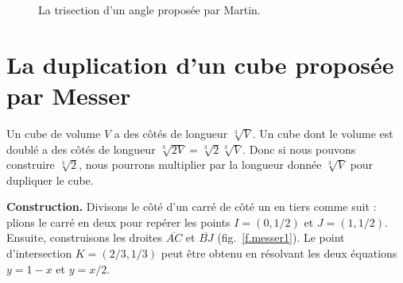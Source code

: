 \begin{figure}[htbp]

\caption{La trisection d'un angle proposée par Martin.}\label{f.martin}
\end{figure}



\section{La duplication d'un cube proposée par Messer}\label{s.messer}

Un cube de volume $V$ a des côtés de longueur $\sqrt[3]{V}$. Un cube dont le volume est doublé a des côtés de longueur $\sqrt[3]{2 V}=\sqrt[3]{2}\sqrt[3]{V}$. Donc si nous pouvons construire $\sqrt[3]{2}$, nous pourrons multiplier par la longueur donnée $\sqrt[3]{V}$ pour dupliquer le cube.

\medspace

\noindent\textbf{Construction.}
Divisons le côté d'un carré de côté un en tiers comme suit : plions le carré en deux pour repérer les points $I=(0,1/2)$ et $J=(1,1/2)$. Ensuite, construisons les droites $\overline{AC}$ et $\overline{BJ}$ (fig.~\ref{f.messer1}). Le point d'intersection $K=(2/3,1/3)$ peut être obtenu en résolvant les deux équations $y=1-x$ et $y=x/2$.

